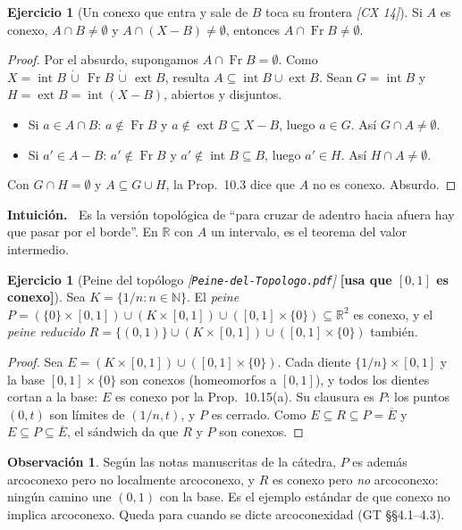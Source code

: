 \documentclass[11pt,a4paper]{article}
\newenvironment{intuicion}{\begin{cajaint}\small\textbf{Intuición.\ }}{\end{cajaint}}
\newcommand{\noentra}[1]{{\normalfont\small\bfseries\color{red!55!black}[#1]}}
\newenvironment{lista}{\leavevmode\begin{itemize}[leftmargin=1.5em,itemsep=1pt,topsep=2pt,parsep=0pt]}{\end{itemize}}
\theoremstyle{definition}
\newtheorem{observacion}[definicion]{Observación}
\newtheorem{ejercicio}[definicion]{Ejercicio}
\theoremstyle{plain}
\newcommand{\fnt}[1]{{\normalfont\small\itshape\color{gray!150!black}[#1]}}
\newcommand{\R}{\mathbb{R}}
\newcommand{\N}{\mathbb{N}}
\newcommand{\cl}[1]{\overline{#1}}
\newcommand{\intr}{\operatorname{int}}
\newcommand{\fr}{\operatorname{Fr}}
\newcommand{\ext}{\operatorname{ext}}
\begin{document}
\begin{ejercicio}[Un conexo que entra y sale de $B$ toca su frontera \fnt{CX 14}]
Si $A$ es conexo, $A\cap B\ne\emptyset$ y $A\cap(X-B)\ne\emptyset$, entonces $A\cap\fr B\ne\emptyset$.
\end{ejercicio}

\begin{proof}
Por el absurdo, supongamos $A\cap\fr B=\emptyset$. Como $X=\intr B\,\dot\cup\,\fr B\,\dot\cup\,\ext B$, resulta $A\subseteq\intr B\cup\ext B$. Sean $G=\intr B$ y $H=\ext B=\intr(X-B)$, abiertos y disjuntos.
\begin{lista}
\item Si $a\in A\cap B$: $a\notin\fr B$ y $a\notin\ext B\subseteq X-B$, luego $a\in G$. Así $G\cap A\ne\emptyset$.
\item Si $a'\in A-B$: $a'\notin\fr B$ y $a'\notin\intr B\subseteq B$, luego $a'\in H$. Así $H\cap A\ne\emptyset$.
\end{lista}
Con $G\cap H=\emptyset$ y $A\subseteq G\cup H$, la Prop.\ 10.3 dice que $A$ no es conexo. Absurdo.
\end{proof}

\begin{intuicion}
Es la versión topológica de ``para cruzar de adentro hacia afuera hay que pasar por el borde''. En $\R$ con $A$ un intervalo, es el teorema del valor intermedio.
\end{intuicion}

\begin{ejercicio}[Peine del topólogo \fnt{\texttt{Peine-del-Topologo.pdf}} \noentra{usa que $[0,1]$ es conexo}]
Sea $K=\{1/n: n\in\N\}$. El \emph{peine} $P=(\{0\}\times[0,1])\cup(K\times[0,1])\cup([0,1]\times\{0\})\subseteq\R^2$ es conexo, y el \emph{peine reducido} $R=\{(0,1)\}\cup(K\times[0,1])\cup([0,1]\times\{0\})$ también.
\end{ejercicio}

\begin{proof}
Sea $E=(K\times[0,1])\cup([0,1]\times\{0\})$. Cada diente $\{1/n\}\times[0,1]$ y la base $[0,1]\times\{0\}$ son conexos (homeomorfos a $[0,1]$), y todos los dientes cortan a la base: $E$ es conexo por la Prop.\ 10.15(a). Su clausura es $P$: los puntos $(0,t)$ son límites de $(1/n,t)$, y $P$ es cerrado. Como $E\subseteq R\subseteq P=\cl E$ y $E\subseteq P\subseteq\cl E$, el sándwich da que $R$ y $P$ son conexos.
\end{proof}

\begin{observacion}
Según las notas manuscritas de la cátedra, $P$ es además arcoconexo pero no localmente arcoconexo, y $R$ es conexo pero \emph{no} arcoconexo: ningún camino une $(0,1)$ con la base. Es el ejemplo estándar de que conexo no implica arcoconexo. Queda para cuando se dicte arcoconexidad (GT \S\S4.1--4.3).
\end{observacion}
\end{document}
